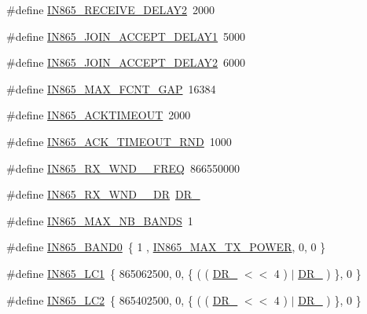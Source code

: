 \begin{DoxyCompactItemize}
\#define \hyperlink{group__REGIONIN865_ga466f7d5de82107e42f3ceb0a312cb833}{I\+N865\+\_\+\+R\+E\+C\+E\+I\+V\+E\+\_\+\+D\+E\+L\+A\+Y2}~2000
\item 
\#define \hyperlink{group__REGIONIN865_gaa1f6bf34fbc09d19267191ae009d9acc}{I\+N865\+\_\+\+J\+O\+I\+N\+\_\+\+A\+C\+C\+E\+P\+T\+\_\+\+D\+E\+L\+A\+Y1}~5000
\item 
\#define \hyperlink{group__REGIONIN865_gaa3078b10a852a328bf425e8b5d5969d1}{I\+N865\+\_\+\+J\+O\+I\+N\+\_\+\+A\+C\+C\+E\+P\+T\+\_\+\+D\+E\+L\+A\+Y2}~6000
\item 
\#define \hyperlink{group__REGIONIN865_ga8af1e01f501561a336d851c84dbd81b9}{I\+N865\+\_\+\+M\+A\+X\+\_\+\+F\+C\+N\+T\+\_\+\+G\+AP}~16384
\item 
\#define \hyperlink{group__REGIONIN865_ga846d440d91293486df884023fe5a3449}{I\+N865\+\_\+\+A\+C\+K\+T\+I\+M\+E\+O\+UT}~2000
\item 
\#define \hyperlink{group__REGIONIN865_ga271017fa88b513c5e7a46a56122f2f9e}{I\+N865\+\_\+\+A\+C\+K\+\_\+\+T\+I\+M\+E\+O\+U\+T\+\_\+\+R\+ND}~1000
\item 
\#define \hyperlink{group__REGIONIN865_ga22d8f8d2c263922a14c5e41f41eea46a}{I\+N865\+\_\+\+R\+X\+\_\+\+W\+N\+D\+\_\+\_\+\+F\+R\+EQ}~866550000
\item 
\#define \hyperlink{group__REGIONIN865_ga0ffc8ecfa8415acdb00901ffca1e2f1b}{I\+N865\+\_\+\+R\+X\+\_\+\+W\+N\+D\+\_\+\_\+\+DR}~\hyperlink{group__REGION_gad402daa928a8b3dea829315fab69de17}{D\+R\+\_}
\item 
\#define \hyperlink{group__REGIONIN865_ga0cb9f2d2f0224a649a6e53522acb2ad6}{I\+N865\+\_\+\+M\+A\+X\+\_\+\+N\+B\+\_\+\+B\+A\+N\+DS}~1
\item 
\#define \hyperlink{group__REGIONIN865_gafe17c0a123d728b699efa637aed2459d}{I\+N865\+\_\+\+B\+A\+N\+D0}~\{ 1 , \hyperlink{group__REGIONIN865_ga6bd515d7c4fbad47210702da1d9396a3}{I\+N865\+\_\+\+M\+A\+X\+\_\+\+T\+X\+\_\+\+P\+O\+W\+ER}, 0,  0 \}
\item 
\#define \hyperlink{group__REGIONIN865_gab2e4ff59116b5b7ea17b56379b9b1fbc}{I\+N865\+\_\+\+L\+C1}~\{ 865062500, 0, \{ ( ( \hyperlink{group__REGION_ga872e12c82020c02a7f70a1c6ed1375df}{D\+R\+\_} $<$$<$ 4 ) $\vert$ \hyperlink{group__REGION_ga6c4ef966b4f3d5eb7597b087f2b97095}{D\+R\+\_} ) \}, 0 \}
\item 
\#define \hyperlink{group__REGIONIN865_ga737c986f456a7cc50b7efcbae64da6a0}{I\+N865\+\_\+\+L\+C2}~\{ 865402500, 0, \{ ( ( \hyperlink{group__REGION_ga872e12c82020c02a7f70a1c6ed1375df}{D\+R\+\_} $<$$<$ 4 ) $\vert$ \hyperlink{group__REGION_ga6c4ef966b4f3d5eb7597b087f2b97095}{D\+R\+\_} ) \}, 0 \}

\end{DoxyCompactItemize}
